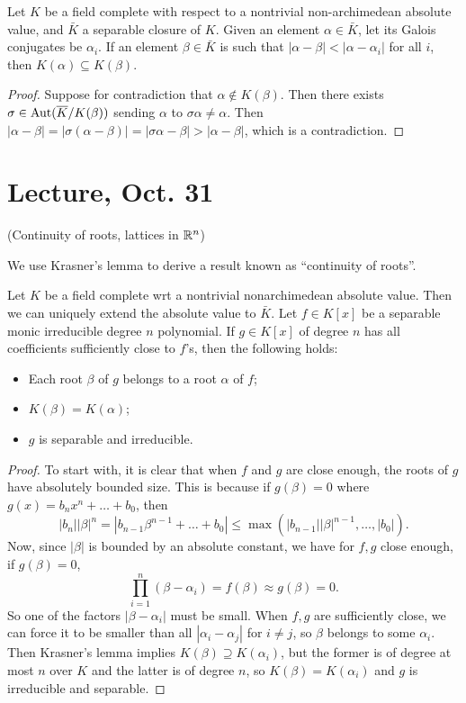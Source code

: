 \documentclass[11pt]{amsart}
\begin{document}
\begin{lem}
Let $K$ be a field complete with respect to a nontrivial non-archimedean absolute value, and $\bar{K}$ a separable closure of $K$. Given an element $\alpha\in \bar{K}$, let its Galois conjugates be $\alpha_i$. If an element $\beta\in \bar{K}$ is such that $|\alpha-\beta| < |\alpha-\alpha_i|$ for all $i$, then $K(\alpha)\subseteq K(\beta)$.
\end{lem}

\begin{proof}
Suppose for contradiction that $\alpha\notin K(\beta)$. Then there exists $\sigma \in \operatorname{Aut}(\overline{K}/K(\beta))$ sending $\alpha$ to $\sigma\alpha\neq\alpha$. Then $|\alpha - \beta| = |\sigma(\alpha-\beta)| = |\sigma\alpha - \beta| > |\alpha - \beta|$, which is a contradiction.
\end{proof}


\section{Lecture, Oct. 31}

(Continuity of roots, lattices in $\mathbb{R}^n$)

We use Krasner's lemma to derive a result known as ``continuity of roots''.

\begin{prop}
Let $K$ be a field complete wrt a nontrivial nonarchimedean absolute value. Then we can uniquely extend the absolute value to $\bar{K}$. Let $f\in K[x]$ be a separable monic irreducible degree $n$ polynomial. If $g\in K[x]$ of degree $n$ has all coefficients sufficiently close to $f$'s, then the following holds:
\begin{itemize}
    \item Each root $\beta$ of $g$ belongs to a root $\alpha$ of $f$;
    \item $K(\beta) = K(\alpha)$;
    \item $g$ is separable and irreducible.
\end{itemize}
\end{prop}

\begin{proof}
To start with, it is clear that when $f$ and $g$ are close enough, the roots of $g$ have absolutely bounded size. This is because if $g(\beta) = 0$ where $g(x) = b_nx^n + \dots + b_0$, then
\[|b_n||\beta|^n = |b_{n-1}\beta^{n-1}+\dots+b_0|\le \max(|b_{n-1}||\beta|^{n-1},\dots,|b_0|).\]
Now, since $|\beta|$ is bounded by an absolute constant, we have for $f,g$ close enough, if $g(\beta) = 0$,
\[\prod_{i=1}^n (\beta - \alpha_i) = f(\beta) \approx g(\beta) = 0.\]
So one of the factors $|\beta - \alpha_i| $ must be small. When $f,g$ are sufficiently close, we can force it to be smaller than all $|\alpha_i - \alpha_j|$ for $i\neq j$, so $\beta$ belongs to some $\alpha_i$. Then Krasner's lemma implies $K(\beta) \supseteq K(\alpha_i)$, but the former is of degree at most $n$ over $K$ and the latter is of degree $n$, so $K(\beta) = K(\alpha_i)$ and $g$ is irreducible and separable. 
\end{proof}
\end{document}
